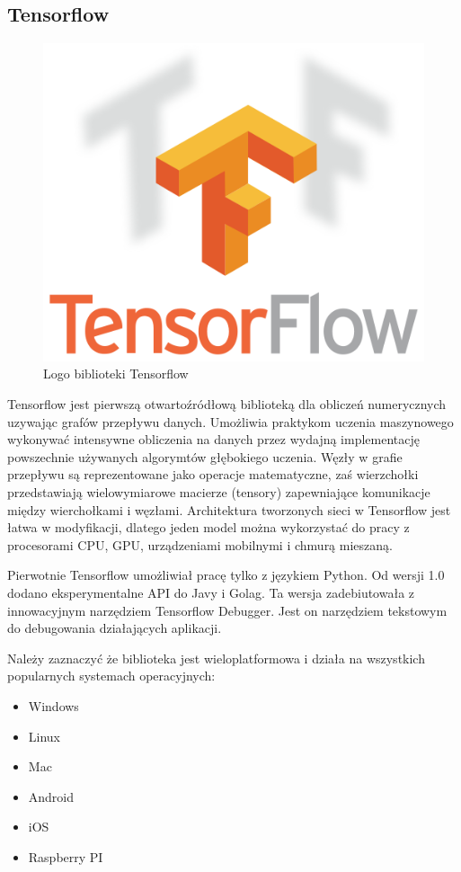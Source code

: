 \documentclass[12pt,a4paper,twoside,titlepage,openright]{book}
\begin{document}
\subsection{Tensorflow}
\begin{figure}[h]
	\centering
			\includegraphics[resolution=100, scale=0.5]{Tensorflow.png}
		\caption{Logo biblioteki Tensorflow}
\end{figure}

Tensorflow jest pierwszą otwartoźródłową biblioteką dla obliczeń numerycznych uzywając grafów przepływu danych. Umożliwia praktykom uczenia maszynowego wykonywać intensywne obliczenia na danych przez wydajną implementację powszechnie używanych algorymtów głębokiego uczenia. Węzły w grafie przepływu są reprezentowane jako operacje matematyczne, zaś wierzchołki przedstawiają wielowymiarowe macierze (tensory) zapewniające komunikacje między wierchołkami i węzłami. Architektura tworzonych sieci w Tensorflow jest łatwa w modyfikacji, dlatego jeden model można wykorzystać do pracy z procesorami CPU, GPU, urządzeniami mobilnymi i chmurą mieszaną. \cite{DeepLearningTensorflow}

Pierwotnie Tensorflow umożliwiał pracę tylko z językiem Python. Od wersji 1.0 dodano eksperymentalne API do Javy i Golag. Ta wersja zadebiutowała z innowacyjnym narzędziem Tensorflow Debugger. Jest on narzędziem tekstowym do debugowania działających aplikacji.

Należy zaznaczyć że biblioteka jest wieloplatformowa i działa na wszystkich popularnych systemach operacyjnych:
\begin{itemize}
\item Windows
\item Linux
\item Mac
\item Android
\item iOS
\item Raspberry PI
\end{itemize}
\end{document}
